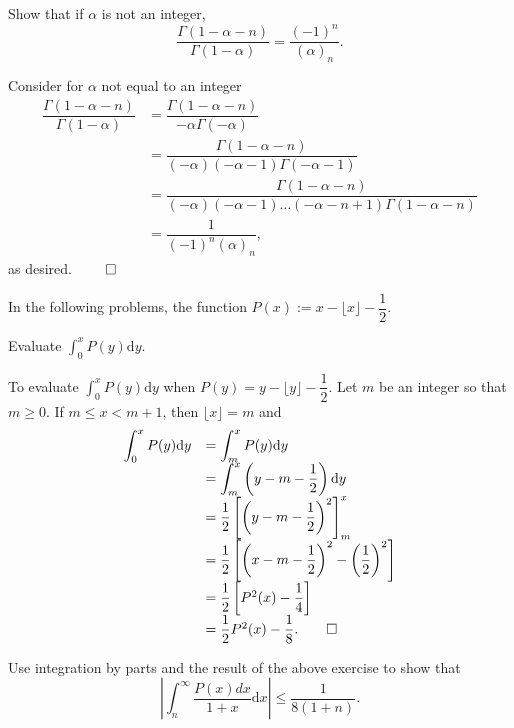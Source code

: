 \newpage
\begin{problem}\label{problem9chapter2}
Show that if $\alpha$ is not an integer,
$$\dfrac{\Gamma(1-\alpha-n)}{\Gamma(1-\alpha)} = \dfrac{(-1)^n}{(\alpha)_n}.$$
\end{problem}
\begin{solution}
Consider for $\alpha$ not equal to an integer
$$\begin{array}{ll}
\dfrac{\Gamma(1-\alpha-n)}{\Gamma(1-\alpha)} &= \dfrac{\Gamma(1-\alpha-n)}{-\alpha\Gamma(-\alpha)} \\
&= \dfrac{\Gamma(1-\alpha-n)}{(-\alpha)(-\alpha-1)\Gamma(-\alpha-1)} \\
&= \dfrac{\Gamma(1-\alpha-n)}{(-\alpha)(-\alpha-1)\ldots(-\alpha-n+1)\Gamma(1-\alpha-n)} \\
&= \dfrac{1}{(-1)^n(\alpha)_n},
\end{array}$$
as desired. $\qed$
\end{solution}
In the following problems, the function $P(x) := x - \lfloor x \rfloor - \dfrac{1}{2}$. 
\begin{problem}\label{problem10chapter2}
Evaluate $\displaystyle\int_0^x P(y) \mathrm{d}y$.
\end{problem}
\begin{solution}
To evaluate $\displaystyle\int_0^x P(y) \mathrm{d}y$ when $P(y)=y- \lfloor y \rfloor -\dfrac{1}{2}$. Let $m$ be an integer so that $m \geq 0$. If $m \leq x < m+1$, then $\lfloor x \rfloor=m$ and
$$\begin{array}{ll}
\displaystyle\int_0^x P(y) \mathrm{d}y &= \displaystyle\int_m^x P(y) \mathrm{d}y \\
&= \displaystyle\int_m^x \left(y-m-\dfrac{1}{2} \right) \mathrm{d}y \\
&= \dfrac{1}{2}\left[\left(y-m-\dfrac{1}{2} \right)^2 \right]_m^x \\
&= \dfrac{1}{2} \left[ \left(x-m-\dfrac{1}{2} \right)^2 - \left(\dfrac{1}{2}\right)^2 \right] \\
&= \dfrac{1}{2} \left[ P^2(x)-\dfrac{1}{4} \right] \\
&= \dfrac{1}{2} P^2(x)-\dfrac{1}{8}. \qed
\end{array}$$
\end{solution}
\begin{problem}\label{problem11chapter2}
Use integration by parts and the result of the above exercise to show that
$$\left| \displaystyle\int_n^{\infty} \dfrac{P(x)dx}{1+x} \mathrm{d}x \right| \leq \dfrac{1}{8(1+n)}.$$
\end{problem}
